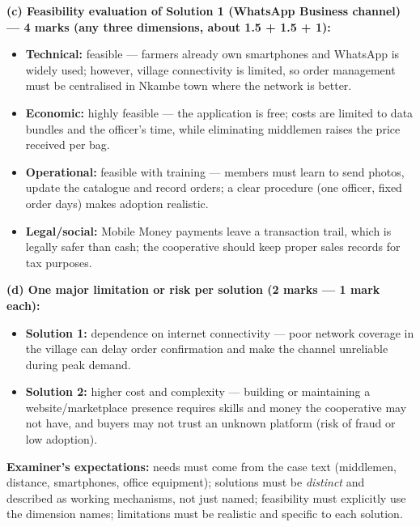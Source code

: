 \documentclass[11pt]{article}
\begin{document}
\begin{corrige}
\textbf{(c) Feasibility evaluation of Solution 1 (WhatsApp Business channel) — 4 marks (any three dimensions, about 1.5 + 1.5 + 1):}
\begin{itemize}
\item \textbf{Technical:} feasible — farmers already own smartphones and WhatsApp is widely used; however, village connectivity is limited, so order management must be centralised in Nkambe town where the network is better.
\item \textbf{Economic:} highly feasible — the application is free; costs are limited to data bundles and the officer's time, while eliminating middlemen raises the price received per bag.
\item \textbf{Operational:} feasible with training — members must learn to send photos, update the catalogue and record orders; a clear procedure (one officer, fixed order days) makes adoption realistic.
\item \textbf{Legal/social:} Mobile Money payments leave a transaction trail, which is legally safer than cash; the cooperative should keep proper sales records for tax purposes.
\end{itemize}

\textbf{(d) One major limitation or risk per solution (2 marks — 1 mark each):}
\begin{itemize}
\item \textbf{Solution 1:} dependence on internet connectivity — poor network coverage in the village can delay order confirmation and make the channel unreliable during peak demand.
\item \textbf{Solution 2:} higher cost and complexity — building or maintaining a website/marketplace presence requires skills and money the cooperative may not have, and buyers may not trust an unknown platform (risk of fraud or low adoption).
\end{itemize}

\textbf{Examiner's expectations:} needs must come from the case text (middlemen, distance, smartphones, office equipment); solutions must be \emph{distinct} and described as working mechanisms, not just named; feasibility must explicitly use the dimension names; limitations must be realistic and specific to each solution.
\end{corrige}
\end{document}
